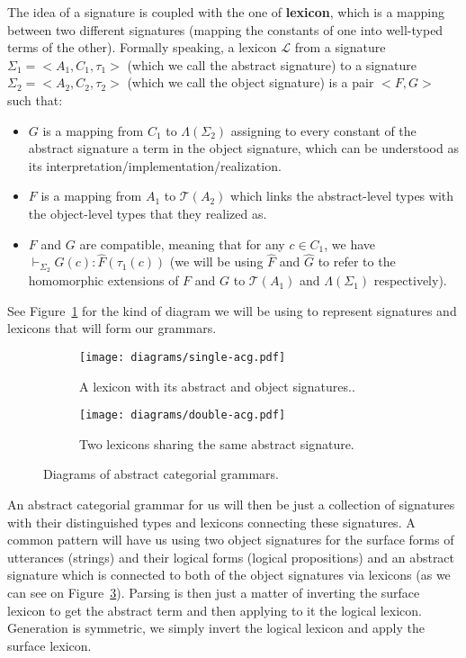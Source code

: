 The idea of a signature is coupled with the one of \textbf{lexicon},
which is a mapping between two different signatures (mapping the
constants of one into well-typed terms of the other). Formally speaking,
a lexicon $\mathcal{L}$ from a signature $\Sigma_1 = \mathopen{<}A_1,
C_1, \tau_1\mathclose{>}$ (which we call the abstract signature) to a
signature $\Sigma_2 = \mathopen{<}A_2, C_2, \tau_2\mathclose{>}$ (which
we call the object signature) is a pair $\mathopen{<}F, G\mathclose{>}$
such that:

\begin{itemize}
\item $G$ is a mapping from $C_1$ to $\Lambda(\Sigma_2)$ assigning to
  every constant of the abstract signature a term in the object
  signature, which can be understood as its
  interpretation/implementation/realization.
\item $F$ is a mapping from $A_1$ to $\mathcal{T}(A_2)$ which links the
  abstract-level types with the object-level types that they realized
  as.
\item $F$ and $G$ are compatible, meaning that for any $c \in C_1$, we
  have $\vdash_{\Sigma_2} G(c) : \hat{F}(\tau_1(c))$ (we will be using
  $\hat{F}$ and $\hat{G}$ to refer to the homomorphic extensions of $F$
  and $G$ to $\mathcal{T}(A_1)$ and $\Lambda(\Sigma_1)$ respectively).
\end{itemize}

See Figure~\ref{fig:single-acg} for the kind of diagram we will be using
to represent signatures and lexicons that will form our grammars.

\begin{figure}
  \centering
  \begin{subfigure}[b]{0.4\textwidth}
    \centering
    \texttt{[image: diagrams/single-acg.pdf]}
    \caption{{\label{fig:single-acg} A lexicon with its abstract
        and object signatures..}}
  \end{subfigure}
  \qquad
  \begin{subfigure}[b]{0.4\textwidth}
    \centering
    \texttt{[image: diagrams/double-acg.pdf]}
    \caption{{\label{fig:double-acg} Two lexicons sharing the same
        abstract signature.}}
  \end{subfigure}
  \caption{Diagrams of abstract categorial grammars.}
\end{figure}

An abstract categorial grammar for us will then be just a collection of
signatures with their distinguished types and lexicons connecting these
signatures. A common pattern will have us using two object signatures
for the surface forms of utterances (strings) and their logical forms
(logical propositions) and an abstract signature which is connected to
both of the object signatures via lexicons (as we can see on
Figure~\ref{fig:double-acg}). Parsing is then just a matter of inverting
the surface lexicon to get the abstract term and then applying to it the
logical lexicon. Generation is symmetric, we simply invert the logical
lexicon and apply the surface lexicon.

